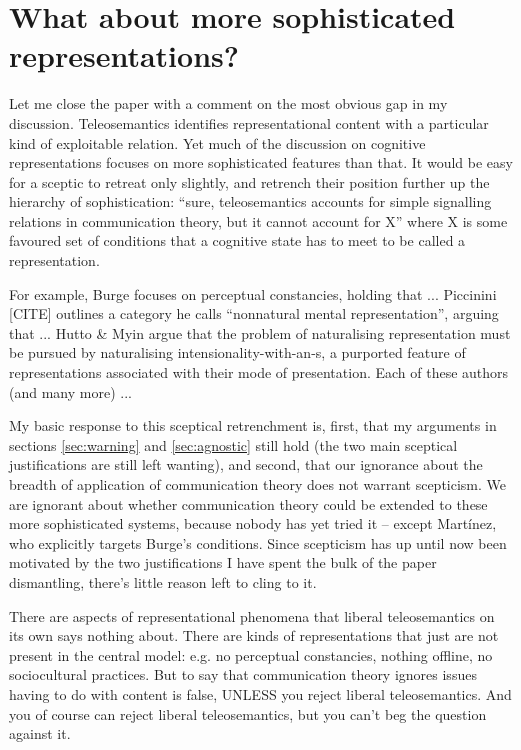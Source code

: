 \documentclass[12pt]{article}
\begin{document}
\section{What about more sophisticated representations?}\label{sec:sophisticated}

Let me close the paper with a comment on the most obvious gap in my discussion.
Teleosemantics identifies representational content with a particular kind of exploitable relation. 
Yet much of the discussion on cognitive representations focuses on more sophisticated features than that.
It would be easy for a sceptic to retreat only slightly, and retrench their position further up the hierarchy of sophistication: ``sure, teleosemantics accounts for simple signalling relations in communication theory, but it cannot account for X'' where X is some favoured set of conditions that a cognitive state has to meet to be called a representation.

For example, Burge focuses on perceptual constancies, holding that ...
Piccinini [CITE] outlines a category he calls ``nonnatural mental representation'', arguing that ...
Hutto \& Myin argue that the problem of naturalising representation must be pursued by naturalising intensionality-with-an-s, a purported feature of representations associated with their mode of presentation.
Each of these authors (and many more) ...

My basic response to this sceptical retrenchment is, first, that my arguments in sections \ref{sec:warning} and \ref{sec:agnostic} still hold (the two main sceptical justifications are still left wanting), and second, that our ignorance about the breadth of application of communication theory does not warrant scepticism.
We are ignorant about whether communication theory could be extended to these more sophisticated systems, because nobody has yet tried it -- except Mart\'{i}nez, who explicitly targets Burge's conditions.
Since scepticism has up until now been motivated by the two justifications I have spent the bulk of the paper dismantling, there's little reason left to cling to it.

There are aspects of representational phenomena that liberal teleosemantics on its own says nothing about.
There are kinds of representations that just are not present in the central model: e.g. no perceptual constancies, nothing offline, no sociocultural practices.
But to say that communication theory ignores issues having to do with content is false, UNLESS you reject liberal teleosemantics.
And you of course can reject liberal teleosemantics, but you can't beg the question against it.
\end{document}
